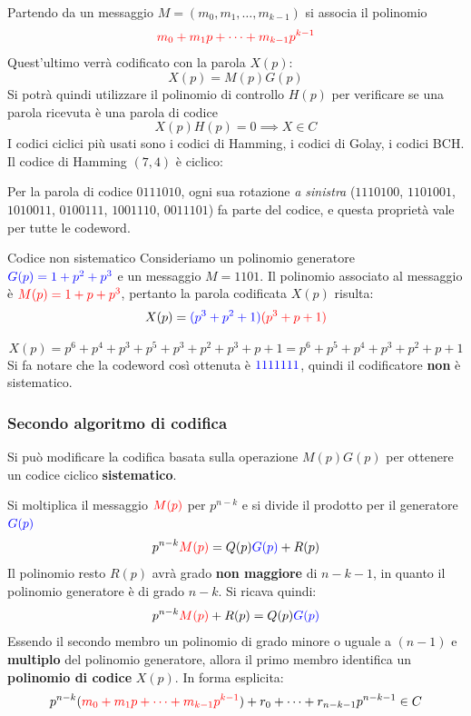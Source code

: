 Partendo da un messaggio $M=(m_0, m_1, \dots, m_{k-1})$ si associa il polinomio
\[\textcolor{red}{m_0+m_1p+ \dots + m_{k-1}p^{k-1}}\]
Quest'ultimo verrà codificato con la parola $X(p)$:
\[X(p) = M(p)G(p)\]
Si potrà quindi utilizzare il polinomio di controllo $H(p)$ per verificare se una parola ricevuta è una parola di codice
\[X(p)H(p) = 0 \implies X \in C\]
I codici ciclici più usati sono i codici di Hamming, i codici di Golay, i codici BCH.
Il codice di Hamming $(7,4)$ è ciclico:

\noindent
Per la parola di codice $0111010$, ogni sua rotazione \textit{a sinistra} ($1110100$, $1101001$, $1010011$, $0100111$, $1001110$, $0011101$) fa parte del codice, e questa proprietà vale per tutte le codeword.
\begin{esempio}{Codice non sistematico}
Consideriamo un polinomio generatore $\textcolor{blue}{G(p)= 1+p^2+p^3}$ e un messaggio $M=1101$. Il polinomio associato al messaggio è $\textcolor{red}{M(p)= 1+p+p^3}$, pertanto la parola codificata $X(p)$ risulta:
\[ X(p)= \textcolor{blue}{(p^3+p^2+1)}\textcolor{red}{(p^3+p+1)}\]

\[X(p)= p^6 + p^4 + p^3 + p^5 + p^3+ p^2 + p^3 + p + 1= p^6 + p^5+p^4 +p^3+ p^2 + p + 1\]
Si fa notare che la codeword così ottenuta è $\textcolor{blue}{1111111}$, quindi il codificatore \textbf{non} è sistematico.
\end{esempio}

\subsubsection{Secondo algoritmo di codifica}
Si può modificare la codifica basata sulla operazione $M(p)G(p)$ per ottenere un codice ciclico \textbf{sistematico}.

Si moltiplica il messaggio $\textcolor{red}{M(p)}$ per $p^{n-k}$ e si divide il prodotto per il generatore $\textcolor{blue}{G(p)}$
\[p^{n-k}\textcolor{red}{M(p)} = Q(p)\textcolor{blue}{G(p)} + R(p)\]
Il polinomio resto $R(p)$ avrà grado \textbf{non maggiore} di $n-k-1$, in quanto il polinomio generatore è di grado $n-k$.
Si ricava quindi:
\[p^{n-k}\textcolor{red}{M(p)} + R(p) = Q(p)\textcolor{blue}{G(p)}\]
Essendo il secondo membro un polinomio di grado minore o uguale a $(n-1)$ e \textbf{multiplo} del polinomio generatore, allora il primo membro identifica un \textbf{polinomio di codice} $X(p)$.
In forma esplicita:
\[
p^{n-k} ( \textcolor{red}{m_0 + m_1 p + \dots + m_{k-1} p^{k-1}} ) + r_0 + \dots + r_{n-k-1} p^{n-k-1} \in C
\]

